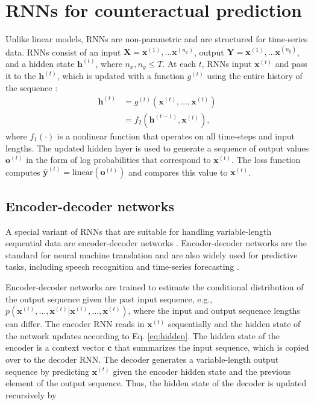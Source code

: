 \documentclass[hidelinks,12pt]{article}
\begin{document}
\section{RNNs for counteractual prediction} \label{RNNs-section}

Unlike linear models, RNNs are non-parametric and are structured for time-series data. RNNs consist of an input $\boldsymbol{X} = \boldsymbol{x}^(1), \ldots \boldsymbol{x}^(n_x)$, output $\boldsymbol{Y} = \boldsymbol{x}^(1), \ldots \boldsymbol{x}^(n_y)$, and a hidden state $\boldsymbol{h}^{(t)}$, where $n_x, n_y \leq T$. At each $t$, RNNs input $\boldsymbol{x}^{(t)}$ and pass it to the $\boldsymbol{h}^{(t)}$, which is updated with a function $g^{(t)}$ using the entire history of the sequence \citep{goodfellow2016deep}:
%
\begin{align}
\boldsymbol{h}^{(t)} &= g^{(t)} \left(\boldsymbol{x}^{(t)}, \ldots, \boldsymbol{x}^{(t)} \right) \nonumber \\ 
&= f_2 \left( \boldsymbol{h}^{(t-1)}, \boldsymbol{x}^{(t)} \right), \label{eq:hidden}
\end{align} where $f_1(\cdot)$ is a nonlinear function that operates on all time-steps and input lengths. The updated hidden layer is used to generate a sequence of output values $\boldsymbol{o}^{(t)}$ in the form of log probabilities that correspond to $\boldsymbol{x}^{(t)}$. The loss function computes $\boldsymbol{\hat{y}}^{(t)} = \mathrm{linear} (\boldsymbol{o}^{(t)})$ and compares this value to $\boldsymbol{x}^{(t)}$.

\subsection{Encoder-decoder networks}

A special variant of RNNs that are suitable for handling variable-length sequential data are encoder-decoder networks \citep{cho2014learning}. Encoder-decoder networks are the standard for neural machine translation \citep{bahdanau2014neural,vinyals2014grammar} and are also widely used for predictive tasks, including speech recognition \citep{chorowski2015attention} and time-series forecasting \citep{zhu2017deep}. 

Encoder-decoder networks are trained to estimate the conditional distribution of the output sequence given the past input sequence, e.g., $p (\boldsymbol{x}^{(t)}, \ldots, \boldsymbol{x}^{(t)} | \boldsymbol{x}^{(t)}, \ldots, \boldsymbol{x}^{(t)})$, where the input and output sequence lengths can differ. The encoder RNN reads in $\boldsymbol{x}^{(t)}$ sequentially and the hidden state of the network updates according to Eq. \ref{eq:hidden}. The hidden state of the encoder is a context vector $\boldsymbol{c}$ that summarizes the input sequence, which is copied over to the decoder RNN. The decoder generates a variable-length output sequence by predicting $\boldsymbol{x}^{(t)}$ given the encoder hidden state and the previous element of the output sequence. Thus, the hidden state of the decoder is updated recursively by
\end{document}
